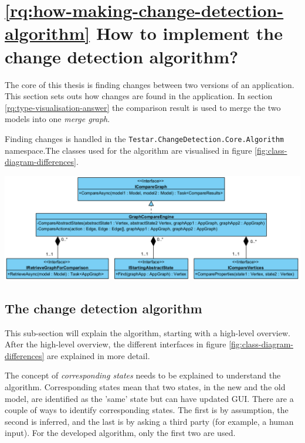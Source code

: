 \section{\ref{rq:how-making-change-detection-algorithm} How to implement the change detection algorithm?} \label{sec:finding-changes}

The core of this thesis is finding changes between two versions of an application. This section sets outs how changes are found in the application. In section \ref{rq:type-visualisation-answer} the comparison result is used to merge the two models into one \textit{merge graph}.

Finding changes is handled in the \verb|Testar.ChangeDetection.Core.Algorithm| namespace.The classes used for the algorithm are visualised in figure \ref{fig:class-diagram-differences}. 

\begingroup
\captionsetup{type=figure}
\includegraphics[scale=0.65]{images/4-UML-Differences.png}
\label{fig:class-diagram-differences}
\endgroup

\subsection{The change detection algorithm} \label{sec:change-detection-algorithm}
This sub-section will explain the algorithm, starting with a high-level overview. After the high-level overview, the different interfaces in figure \ref{fig:class-diagram-differences} are explained in more detail.

The concept of \textit{corresponding states} needs to be explained to understand the algorithm. Corresponding states mean that two states, in the new and the old model, are identified as the 'same' state but can have updated GUI. There are a couple of ways to identify corresponding states. The first is by assumption, the second is inferred, and the last is by asking a third party (for example, a human input). For the developed algorithm, only the first two are used. 

